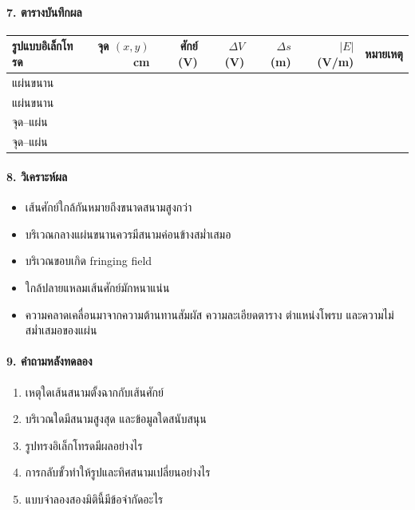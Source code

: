 \paragraph{7. ตารางบันทึกผล}

\begin{table}[htbp]
    \centering
    \begin{tabular}{l r r r r r l}
        \hline
        \textbf{รูปแบบอิเล็กโทรด} & \textbf{จุด \((x,y)\) cm} & \textbf{ศักย์ (V)} & \textbf{\(\Delta V\) (V)} & \textbf{\(\Delta s\) (m)} & \textbf{\(|E|\) (V/m)} & \textbf{หมายเหตุ} \\
        \hline
        แผ่นขนาน &  &  &  &  &  &  \\
        แผ่นขนาน &  &  &  &  &  &  \\
        จุด--แผ่น &  &  &  &  &  &  \\
        จุด--แผ่น &  &  &  &  &  &  \\
        \hline
    \end{tabular}
\end{table}

\paragraph{8. วิเคราะห์ผล}

\begin{itemize}
\item เส้นศักย์ใกล้กันหมายถึงขนาดสนามสูงกว่า
\item บริเวณกลางแผ่นขนานควรมีสนามค่อนข้างสม่ำเสมอ
\item บริเวณขอบเกิด fringing field
\item ใกล้ปลายแหลมเส้นศักย์มักหนาแน่น
\item ความคลาดเคลื่อนมาจากความต้านทานสัมผัส ความละเอียดตาราง ตำแหน่งโพรบ และความไม่สม่ำเสมอของแผ่น
\end{itemize}

\paragraph{9. คำถามหลังทดลอง}

\begin{enumerate}
\item เหตุใดเส้นสนามตั้งฉากกับเส้นศักย์
\item บริเวณใดมีสนามสูงสุด และข้อมูลใดสนับสนุน
\item รูปทรงอิเล็กโทรดมีผลอย่างไร
\item การกลับขั้วทำให้รูปและทิศสนามเปลี่ยนอย่างไร
\item แบบจำลองสองมิตินี้มีข้อจำกัดอะไร
\end{enumerate}

